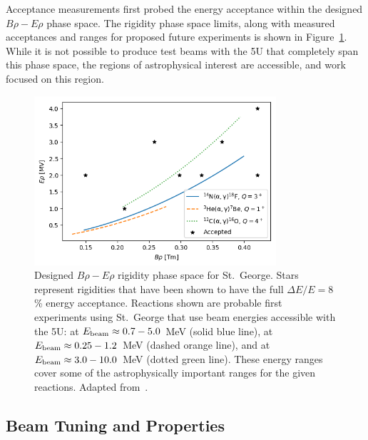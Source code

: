 Acceptance measurements first probed the energy acceptance within the
designed $B\rho-E\rho$ phase space. The rigidity phase space limits,
along with measured acceptances and ranges for proposed future
experiments is shown in Figure~\ref{fig:rigidity-phase-space}. While it
is not possible to produce test beams with the 5U that completely span
this phase space, the regions of astrophysical interest are accessible,
and work focused on this region.

\begin{figure}[t]
   \begin{center}
       \label{fig:rigidity-phase-space}
       \centerline{\includegraphics[width=0.8\textwidth]
           {figures/rigidity_phase_space.png}} \caption[Designed
           $B\rho-E\rho$ rigidity phase space for St.\ George]{Designed
           $B\rho-E\rho$ rigidity phase space for St.\ George. Stars
           represent rigidities that have been shown to have the full
           $\Delta E/E = 8$\,\% energy acceptance. Reactions shown are
           probable first experiments using St.\ George that use beam
           energies accessible with the 5U:  at
           $E_{\rm{beam}}\approx 0.7-5.0$~MeV (solid blue line),
            at $E_{\rm{beam}}\approx 0.25-1.2$~MeV (dashed
           orange line), and  at $E_{\rm{beam}}\approx
           3.0-10.0$~MeV (dotted green line). These energy ranges cover
           some of the astrophysically important ranges for the given
           reactions. Adapted from~\cite{Meisel2017}.}
   \end{center}
\end{figure}


\subsection{Beam Tuning and Properties}
\label{sec:tuning}

